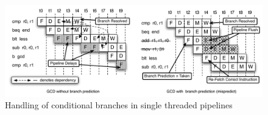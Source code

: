 \begin{figure}
\begin{center}
\includegraphics[scale=.58]{figs/branch_execution_non_interleaved_pipeline}
\end{center}
\vspace{-10pt}
\caption{Handling of conditional branches in single threaded pipelines}
\label{fig:branch_execution_non_interleaved_pipeline}
\end{figure}
  
